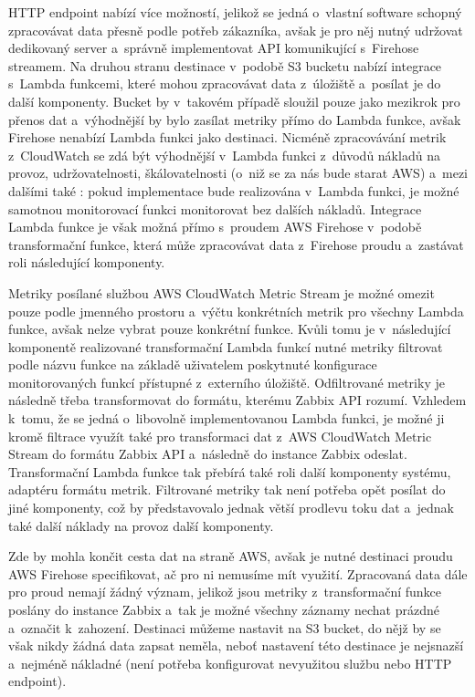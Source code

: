 \documentclass[czech, ing, kiv, he, iso690]{fasthesis}
\begin{document}
HTTP endpoint nabízí více možností, jelikož se jedná o~vlastní software schopný zpracovávat data přesně podle potřeb zákazníka, avšak je pro něj nutný udržovat dedikovaný server a~správně implementovat API komunikující s~Firehose streamem. Na druhou stranu destinace v~podobě S3 bucketu nabízí integrace s~Lambda funkcemi, které mohou zpracovávat data z~úložiště a~posílat je do další komponenty. Bucket by v~takovém případě sloužil pouze jako mezikrok pro přenos dat a~výhodnější by bylo zasílat metriky přímo do Lambda funkce, avšak Firehose nenabízí Lambda funkci jako destinaci. Nicméně zpracovávání metrik z~CloudWatch se zdá být výhodnější v~Lambda funkci z~důvodů nákladů na provoz, udržovatelnosti, škálovatelnosti (o~niž se za nás bude starat AWS) a~mezi dalšími také : pokud implementace bude realizována v~Lambda funkci, je možné samotnou monitorovací funkci monitorovat bez dalších nákladů. Integrace Lambda funkce je však možná přímo s~proudem AWS Firehose v~podobě transformační funkce, která může zpracovávat data z~Firehose proudu a~zastávat roli následující komponenty. 

Metriky posílané službou AWS CloudWatch Metric Stream je možné omezit pouze podle jmenného prostoru a~výčtu konkrétních metrik pro všechny Lambda funkce, avšak nelze vybrat pouze konkrétní funkce. Kvůli tomu je v~následující komponentě realizované transformační Lambda funkcí nutné metriky filtrovat podle názvu funkce na základě uživatelem poskytnuté konfigurace monitorovaných funkcí přístupné z~externího úložiště. Odfiltrované metriky je následně třeba transformovat do formátu, kterému Zabbix API rozumí. Vzhledem k~tomu, že se jedná o~libovolně implementovanou Lambda funkci, je možné ji kromě filtrace využít také pro transformaci dat z~AWS CloudWatch Metric Stream do formátu Zabbix API a~následně do instance Zabbix odeslat. Transformační Lambda funkce tak přebírá také roli další komponenty systému, adaptéru formátu metrik. Filtrované metriky tak není potřeba opět posílat do jiné komponenty, což by představovalo jednak větší prodlevu toku dat a~jednak také další náklady na provoz další komponenty.

Zde by mohla končit cesta dat na straně AWS, avšak je nutné destinaci proudu AWS Firehose specifikovat, ač pro ni nemusíme mít využití. Zpracovaná data dále pro proud nemají žádný význam, jelikož jsou metriky z~transformační funkce poslány  do instance Zabbix a~tak je možné všechny záznamy nechat prázdné a~označit k~zahození. Destinaci můžeme nastavit na S3 bucket, do nějž by se však nikdy žádná data zapsat neměla, neboť nastavení této destinace je nejsnazší a~nejméně nákladné (není potřeba konfigurovat nevyužitou službu nebo HTTP endpoint). 
\end{document}
